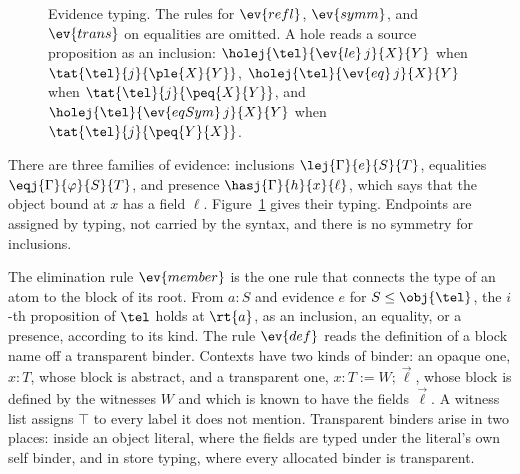 \begin{figure}
\caption{Evidence typing. The rules for $\ev{refl}$, $\ev{symm}$, and $\ev{trans}$ on equalities are omitted. A hole reads a source proposition as an inclusion: $\holej{\tel}{\ev{le}\,j}{X}{Y}$ when $\tat{\tel}{j}{\ple{X}{Y}}$, $\holej{\tel}{\ev{eq}\,j}{X}{Y}$ when $\tat{\tel}{j}{\peq{X}{Y}}$, and $\holej{\tel}{\ev{eqSym}\,j}{X}{Y}$ when $\tat{\tel}{j}{\peq{Y}{X}}$.}
\label{fig:evidence}
\end{figure}

There are three families of evidence: inclusions $\lej{\Gamma}{e}{S}{T}$, equalities $\eqj{\Gamma}{\varphi}{S}{T}$, and presence $\hasj{\Gamma}{h}{x}{\ell}$, which says that the object bound at $x$ has a field $\ell$. Figure~\ref{fig:evidence} gives their typing. Endpoints are assigned by typing, not carried by the syntax, and there is no symmetry for inclusions.

The elimination rule $\ev{member}$ is the one rule that connects the type of an atom to the block of its root. From $a : S$ and evidence $e$ for $S \le \obj{\tel}$, the $i$-th proposition of $\tel$ holds at $\rt{a}$, as an inclusion, an equality, or a presence, according to its kind. The rule $\ev{def}$ reads the definition of a block name off a transparent binder. Contexts have two kinds of binder: an opaque one, $x : T$, whose block is abstract, and a transparent one, $x : T \mathrel{:=} W ; \vec\ell$, whose block is defined by the witnesses $W$ and which is known to have the fields $\vec\ell$. A witness list assigns $\top$ to every label it does not mention. Transparent binders arise in two places: inside an object literal, where the fields are typed under the literal's own self binder, and in store typing, where every allocated binder is transparent.

